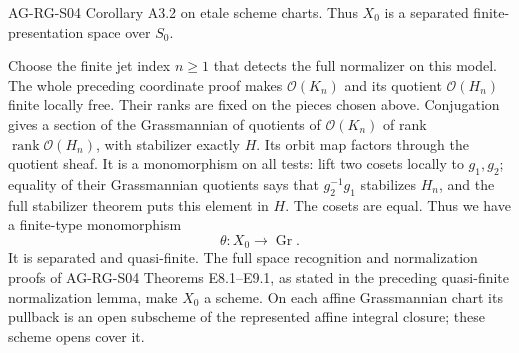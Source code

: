 \documentclass[11pt,a4paper,openany]{report}
\begin{document}
AG-RG-S04 Corollary A3.2 on etale scheme charts. Thus \(X_0\) is a separated finite-presentation space over \(S_0\).

Choose the finite jet index \(n\geq1\) that detects the full normalizer on this model. The whole preceding coordinate proof makes \(\mathcal O(K_n)\) and its quotient \(\mathcal O(H_n)\) finite locally free. Their ranks are fixed on the pieces chosen above. Conjugation gives a section of the Grassmannian of quotients of \(\mathcal O(K_n)\) of rank \(\operatorname{rank}\mathcal O(H_n)\), with stabilizer exactly \(H\). Its orbit map factors through the quotient sheaf. It is a monomorphism on all tests: lift two cosets locally to \(g_1,g_2\); equality of their Grassmannian quotients says that \(g_2^{-1}g_1\) stabilizes \(H_n\), and the full stabilizer theorem puts this element in \(H\). The cosets are equal. Thus we have a finite-type monomorphism \[
 \theta:X_0\longrightarrow\operatorname{Gr}.
\] It is separated and quasi-finite. The full space recognition and normalization proofs of AG-RG-S04 Theorems E8.1--E9.1, as stated in the preceding quasi-finite normalization lemma, make \(X_0\) a scheme. On each affine Grassmannian chart its pullback is an open subscheme of the represented affine integral closure; these scheme opens cover it.
\end{document}
